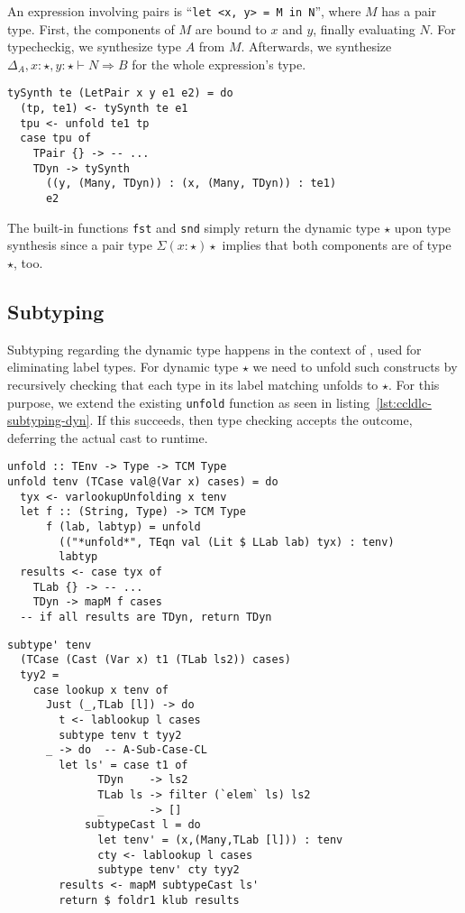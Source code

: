 An expression involving pairs is ``\lstinline[language=ldgv]!let <x, y> = M in N!'', where $M$ has a pair type. First, the components of $M$ are bound to $x$ and $y$, finally evaluating $N$. For typecheckig, we synthesize type $A$ from $M$. Afterwards, we synthesize $\Delta_A, x:\star, y:\star \vdash N \Rightarrow B$ for the whole expression's type.

\begin{lstlisting}[caption=Haskell: Pair type synthesis (\texttt{TCTyping.hs})]
tySynth te (LetPair x y e1 e2) = do
  (tp, te1) <- tySynth te e1
  tpu <- unfold te1 tp
  case tpu of
    TPair {} -> -- ...
    TDyn -> tySynth
      ((y, (Many, TDyn)) : (x, (Many, TDyn)) : te1)
      e2
\end{lstlisting}

The built-in functions \texttt{fst} and \texttt{snd} simply return the dynamic type $\star$ upon type synthesis since a pair type $\Sigma(x:\star)\star$ implies that both components are of type $\star$, too.

\subsection{Subtyping}

Subtyping regarding the dynamic type happens in the context of \case, used for eliminating label types. For dynamic type $\star$ we need to unfold such \case constructs by recursively checking that each type in its label matching unfolds to $\star$. For this purpose, we extend the existing \texttt{unfold} function as seen in listing~\ref{lst:ccldlc-subtyping-dyn}. If this succeeds, then type checking accepts the outcome, deferring the actual cast to runtime.

\begin{lstlisting}[float,
	caption=Haskell: Unfolding to $\star$ in case terms (\texttt{TCSubtyping.hs}),
	label=lst:ccldlc-subtyping-dyn]
unfold :: TEnv -> Type -> TCM Type
unfold tenv (TCase val@(Var x) cases) = do
  tyx <- varlookupUnfolding x tenv
  let f :: (String, Type) -> TCM Type
      f (lab, labtyp) = unfold
        (("*unfold*", TEqn val (Lit $ LLab lab) tyx) : tenv)
        labtyp
  results <- case tyx of
    TLab {} -> -- ...
    TDyn -> mapM f cases
  -- if all results are TDyn, return TDyn
\end{lstlisting}

\begin{lstlisting}[float,
	caption=Haskell: Subtyping for casts in case terms (\texttt{TCSubtyping.hs}),
	label=lst:ccldgv-cast-subtyping]
subtype' tenv
  (TCase (Cast (Var x) t1 (TLab ls2)) cases)
  tyy2 =
    case lookup x tenv of
      Just (_,TLab [l]) -> do
        t <- lablookup l cases
        subtype tenv t tyy2
      _ -> do  -- A-Sub-Case-CL
        let ls' = case t1 of
              TDyn    -> ls2
              TLab ls -> filter (`elem` ls) ls2
              _       -> []
            subtypeCast l = do
              let tenv' = (x,(Many,TLab [l])) : tenv
              cty <- lablookup l cases
              subtype tenv' cty tyy2
        results <- mapM subtypeCast ls'
        return $ foldr1 klub results
\end{lstlisting}

